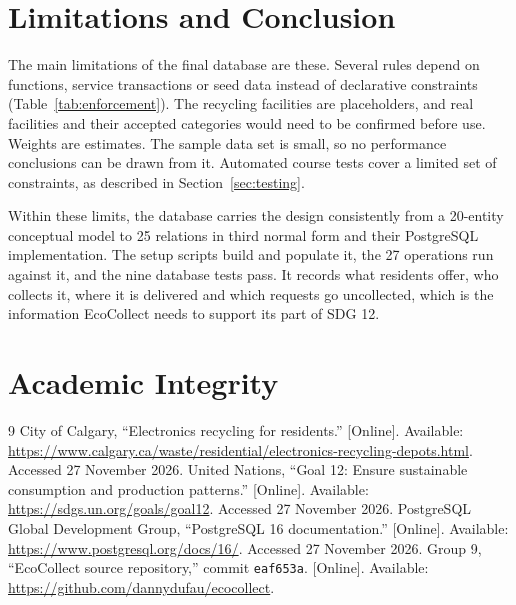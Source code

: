 \documentclass[11pt,letterpaper]{article}
\newcommand{\evidencecommit}{eaf653a} %
\begin{document}
\section{Limitations and Conclusion}
\label{sec:conclusion}
The main limitations of the final database are these. Several rules depend on functions, service transactions or seed data instead of declarative constraints (Table~\ref{tab:enforcement}). The recycling facilities are placeholders, and real facilities and their accepted categories would need to be confirmed before use. Weights are estimates. The sample data set is small, so no performance conclusions can be drawn from it. Automated course tests cover a limited set of constraints, as described in Section~\ref{sec:testing}.

Within these limits, the database carries the design consistently from a 20-entity conceptual model to 25 relations in third normal form and their PostgreSQL implementation. The setup scripts build and populate it, the 27 operations run against it, and the nine database tests pass. It records what residents offer, who collects it, where it is delivered and which requests go uncollected, which is the information EcoCollect needs to support its part of SDG 12.

\section{Academic Integrity}


{}
\begin{thebibliography}{9}
 City of Calgary, ``Electronics recycling for residents.'' [Online]. Available: \url{https://www.calgary.ca/waste/residential/electronics-recycling-depots.html}. Accessed 27 November 2026.
 United Nations, ``Goal 12: Ensure sustainable consumption and production patterns.'' [Online]. Available: \url{https://sdgs.un.org/goals/goal12}. Accessed 27 November 2026.
 PostgreSQL Global Development Group, ``PostgreSQL 16 documentation.'' [Online]. Available: \url{https://www.postgresql.org/docs/16/}. Accessed 27 November 2026.
 Group 9, ``EcoCollect source repository,'' commit \texttt{\evidencecommit}. [Online]. Available: \url{https://github.com/dannydufau/ecocollect}.
\end{thebibliography}
\end{document}
